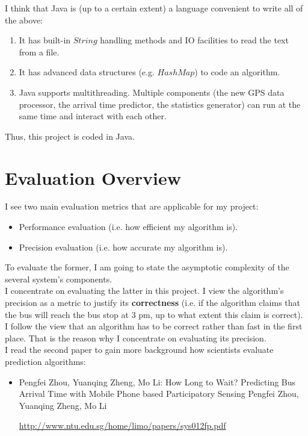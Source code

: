\documentclass[12pt,a4paper,oneside,openright]{report}
\begin{document}
I think that Java is (up to a certain extent) a language convenient to write all of the above:

\begin{enumerate}
\item It has built-in $String$ handling methods and IO facilities to read the text from a file.
\item It has advanced data structures (e.g. $HashMap$) to code an algorithm.
\item Java supports multithreading. Multiple components (the new GPS data processor, the arrival time
      predictor, the statistics generator) can run at the same time and interact with each other.
\end{enumerate}

Thus, this project is coded in Java.

\newpage 

\section{Evaluation Overview}

I see two main evaluation metrics that are applicable for my project:

\begin{itemize}

\item Performance evaluation (i.e. how efficient my algorithm is).

\item Precision evaluation (i.e. how accurate my algorithm is).

\end{itemize}

To evaluate the former, I am going to state the asymptotic complexity of the several
system's components. \\

I concentrate on evaluating the latter in this project. I view the algorithm's precision as
a metric to justify its \textbf{correctness} (i.e. if the algorithm claims that the bus will reach the bus
stop at 3 pm, up to what extent this claim is correct). I follow the view that an algorithm has
to be correct rather than fast in the first place. That is the reason why I concentrate
on evaluating its precision. \\

I read the second paper to gain more background how scientists evaluate prediction algorithms:

\begin{itemize}

\item Pengfei Zhou, Yuanqing Zheng, Mo Li: How Long to Wait? Predicting Bus Arrival Time
      with Mobile Phone based Participatory Sensing Pengfei Zhou, Yuanqing Zheng, Mo Li

\textcolor{blue}{\url{http://www.ntu.edu.sg/home/limo/papers/sys012fp.pdf}}

\end{itemize}
\end{document}
